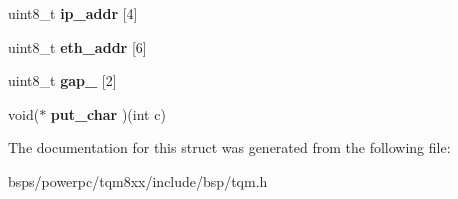 \begin{DoxyCompactItemize}
uint8\+\_\+t {\bfseries ip\+\_\+addr} \mbox{[}4\mbox{]}
\item 
\mbox{\label{structtqm__bd__info__t_a85b543ddacf4122820a5944ade1090fa}} 
uint8\+\_\+t {\bfseries eth\+\_\+addr} \mbox{[}6\mbox{]}
\item 
\mbox{\label{structtqm__bd__info__t_a46c54182f0971172e21fe4a8f9fda225}} 
uint8\+\_\+t {\bfseries gap\+\_} \mbox{[}2\mbox{]}
\item 
\mbox{\label{structtqm__bd__info__t_a8563925917042ac3e40965600cb24c23}} 
void($\ast$ {\bfseries put\+\_\+char} )(int c)
\end{DoxyCompactItemize}


The documentation for this struct was generated from the following file\+:\begin{DoxyCompactItemize}
\item 
bsps/powerpc/tqm8xx/include/bsp/tqm.\+h\end{DoxyCompactItemize}
